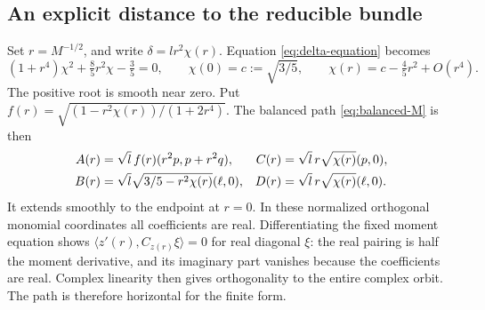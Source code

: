\documentclass[11pt]{amsart}
\theoremstyle{definition}
\theoremstyle{remark}
\begin{document}
\subsection{An explicit distance to the reducible bundle}
Set $r=M^{-1/2}$, and write $\delta=lr^2\chi(r)$. Equation
\eqref{eq:delta-equation} becomes
\begin{equation}\label{eq:chi-equation}
 (1+r^4)\chi^2+\tfrac85r^2\chi-\tfrac35=0,\qquad
 \chi(0)=c:=\sqrt{3/5},\qquad
 \chi(r)=c-\tfrac45r^2+O(r^4).
\end{equation}
The positive root is smooth near zero. Put
$f(r)=\sqrt{(1-r^2\chi(r))/(1+2r^4)}$.
The balanced path \eqref{eq:balanced-M} is then
\begin{align}
 A(r)&=\sqrt l\,f(r)(r^2p,p+r^2q),&
 C(r)&=\sqrt l\,r\sqrt{\chi(r)}(p,0),\notag\\
 B(r)&=\sqrt l\sqrt{3/5-r^2\chi(r)}(\ell,0),&
 D(r)&=\sqrt l\,r\sqrt{\chi(r)}(\ell,0).
 \label{eq:smooth-boundary-path}
\end{align}
It extends smoothly to the endpoint at $r=0$. In these normalized
orthogonal monomial coordinates all coefficients are real. Differentiating
the fixed moment equation shows
$\langle z'(r),C_{z(r)}\xi\rangle=0$ for real diagonal $\xi$:
the real pairing is half the moment derivative, and its imaginary
part vanishes because the coefficients are real. Complex linearity
then gives orthogonality to the entire complex orbit. The path is
therefore horizontal for the finite form.
\end{document}
